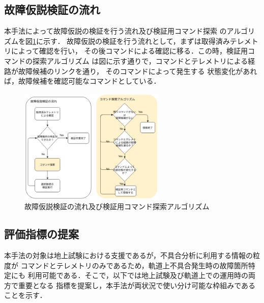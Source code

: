 \documentclass[11pt]{jsarticle}%
\begin{document}
\begin{multicols}{2}
\subsection{故障仮説検証の流れ}
\vspace{-1zh}
本手法によって故障仮説の検証を行う流れ及び検証用コマンド探索
のアルゴリズムを図\ref{fig:algorithm}に示す．
故障仮説の検証を行う流れとして，まずは取得済みテレメトリによって確認を行い，
その後コマンドによる確認に移る．この時，検証用コマンドの探索アルゴリズム
は図に示す通りで，コマンドとテレメトリによる経路が故障候補のリンクを通り，
そのコマンドによって発生する
状態変化があれば，故障候補を確認可能なコマンドとしている．%
\vspace{-1zh}
\begin{figure}[H]
  \centering
    \includegraphics[height=5.5cm]{../figure/COM_search_algorithm.png}
    \caption{故障仮説検証の流れ及び検証用コマンド探索アルゴリズム}%
    \label{fig:algorithm}
\end{figure}
\vspace{-1zh}
\subsection{評価指標の提案}
  \vspace{-1zh}
  本手法の対象は地上試験における支援であるが，不具合分析に利用する情報の粒度が
コマンドとテレメトリのみであるため，軌道上不具合発生時の故障箇所特定にも
利用可能である．そこで，以下では地上試験及び軌道上での運用時の両方で重要となる
指標を提案し，本手法が両状況で使い分け可能な枠組みであることを示す．
\vspace{-1zh}

\end{multicols}
\end{document}
